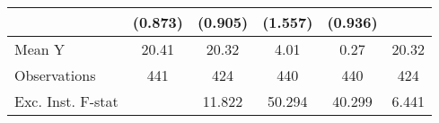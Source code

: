{\begin{tabular}{l*{5}{c}}
            &     (0.873)         &     (0.905)         &     (1.557)         &     (0.936)         &                     \\
\midrule
Mean Y      &       20.41         &       20.32         &        4.01         &        0.27         &       20.32         \\
Observations&         441         &         424         &         440         &         440         &         424         \\
Exc. Inst. F-stat&                     &      11.822         &      50.294         &      40.299         &       6.441         \\
\bottomrule
\end{tabular}
}
